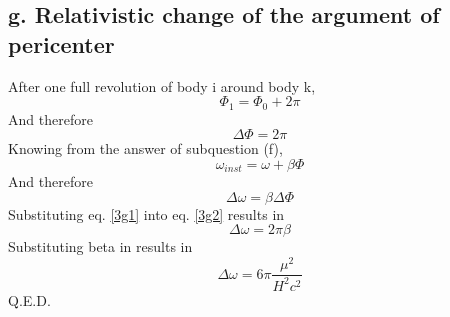 \subsection{g. Relativistic change of the argument of pericenter}
After one full revolution of body i around body k, 
\begin{equation}
\Phi_1 = \Phi_0 + 2 \pi
\end{equation}
And therefore
\begin{equation}
\Delta \Phi = 2\pi
\label{3g1}
\end{equation}
Knowing from the answer of subquestion (f),
\begin{equation}
\omega_{inst} = \omega + \beta\Phi
\end{equation}
And therefore
\begin{equation}
\Delta \omega = \beta \Delta \Phi
\label{3g2}
\end{equation}
Substituting eq. \ref{3g1} into eq. \ref{3g2} results in
\begin{equation}
\Delta \omega = 2 \pi \beta
\end{equation}
Substituting beta in results in  
\begin{equation}
\Delta \omega = 6 \pi \frac{\mu^2}{H^2c^2}
\end{equation}
Q.E.D.









